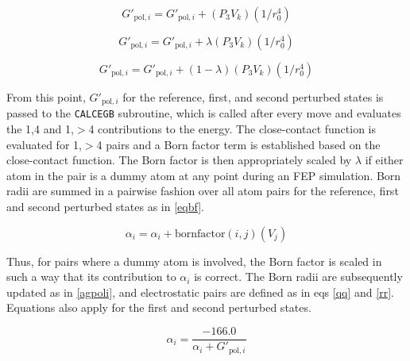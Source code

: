 \documentclass[12pt]{report}
\begin{document}
\vspace*{-0.6cm}
\begin{equation}
\label{buildpoli5}
G'_{ \textrm{pol},i} = G'_{ \textrm{pol},i} + (P_{3}V_{k})(1/r^{4}_{0})
\end{equation}
\vspace*{-1.65cm}

\begin{equation}
\label{buildpoli6}
G'_{ \textrm{pol},i} = G'_{ \textrm{pol},i} + \lambda(P_{3}V_{k})(1/r^{4}_{0})
\end{equation}
\vspace*{-1.65cm}

\begin{equation}
\label{buildpoli7}
G'_{ \textrm{pol},i} = G'_{ \textrm{pol},i} + (1-\lambda)(P_{3}V_{k})(1/r^{4}_{0})
\end{equation}
\vspace*{-0.7cm}

From this point, $G'_{ \textrm{pol},i}$ for the reference, first, and second perturbed states is passed to the {\tt CALCEGB} subroutine, which is called after every move and evaluates the 1,4 and 1,$>$4 contributions to the energy. The close-contact function is evaluated for 1,$>$4 pairs and a Born factor term is established based on the close-contact function. The Born factor is then appropriately scaled by $\lambda$ if either atom in the pair is a dummy atom at any point during an FEP simulation. Born radii are summed in a pairwise fashion over all atom pairs for the reference, first and second perturbed states as in \cref{eqbf}.

\vspace*{-0.5cm}
\begin{equation}
\label{eqbf}
\alpha_{i} = \alpha_{i} + \textrm{bornfactor}(i,j)(V_{j})
\end{equation}
\vspace*{-0.8cm}

Thus, for pairs where a dummy atom is involved, the Born factor is scaled in such a way that its contribution to $\alpha_{i}$ is correct. The Born radii are subsequently updated as in \cref{agpoli}, and electrostatic pairs are defined as in eqs \ref{qq} and \ref{rr}. Equations also apply for the first and second perturbed states.

\vspace*{-0.3cm}
\begin{equation}
\label{agpoli}
\alpha_{i} = \frac{-166.0}{\alpha_{i} + G'_{ \textrm{pol},i}}
\end{equation}
\vspace*{-1.6cm}
\end{document}
